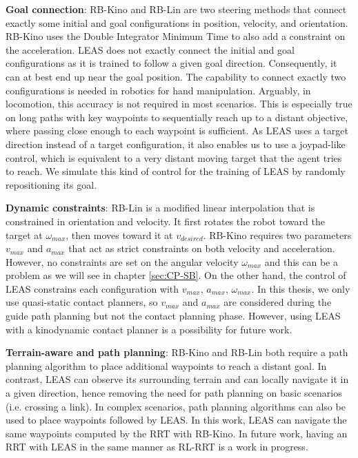 \hfill

\noindent \textbf{Goal connection}:
RB-Kino \cite{kinodynamic_sm_2017} and RB-Lin \cite{AcyclicCP} are two steering methods that connect exactly some initial and goal configurations in position, velocity, and orientation. 
RB-Kino uses the Double Integrator Minimum Time \cite{DIMT} to also add a constraint on the acceleration.
LEAS does not exactly connect the initial and goal configurations as it is trained to follow a given goal direction. Consequently, it can at best end up near the goal position.
The capability to connect exactly two configurations is needed in robotics for hand manipulation. Arguably, in locomotion, this accuracy is not required in most scenarios.
This is especially true on long paths with key waypoints to sequentially reach up to a distant objective, where passing close enough to each waypoint is sufficient.
As LEAS uses a target direction instead of a target configuration, it also enables us to use a joypad-like control, which is equivalent to a very distant moving target that the agent tries to reach. We simulate this kind of control for the training of LEAS by randomly repositioning its goal.

\hfill

\noindent \textbf{Dynamic constraints}:
RB-Lin is a modified linear interpolation that is constrained in orientation and velocity. It first rotates the robot toward the target at $\omega_{max}$, then moves toward it at $v_{desired}$.
RB-Kino requires two parameters $v_{max}$ and $a_{max}$ that act as strict constraints on both velocity and acceleration. However, no constraints are set on the angular velocity $\omega_{max}$ and this can be a problem as we will see in chapter \ref{sec:CP-SB}. 
On the other hand, the control of LEAS constrains each configuration with $v_{max}$, $a_{max}$, $\omega_{max}$. 
In this thesis, we only use quasi-static contact planners, so $v_{max}$ and $a_{max}$ are considered during the guide path planning but not the contact planning phase. However, using LEAS with a kinodynamic contact planner is a possibility for future work.

\hfill

\noindent \textbf{Terrain-aware and path planning}:
RB-Kino and RB-Lin both require a path planning algorithm to place additional waypoints to reach a distant goal. In contrast, LEAS can observe its surrounding terrain and can locally navigate it in a given direction, hence removing the need for path planning on basic scenarios (i.e. crossing a link). 
In complex scenarios, path planning algorithms can also be used to place waypoints followed by LEAS. 
In this work, LEAS can navigate the same waypoints computed by the RRT with RB-Kino. In future work, having an RRT with LEAS in the same manner as RL-RRT \cite{RL_RRT} is a work in progress.

